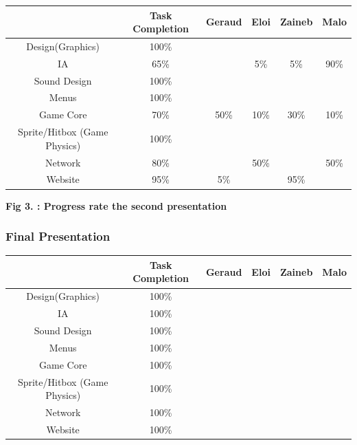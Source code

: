 \documentclass[a4paper, 11pt] {article}
\begin{document}
\begin{center}
\begin{tabular}{|c|c|c|c|c|c|}
    \hline & Task Completion & Geraud & Eloi & Zaineb & Malo  \\
    \hline Design(Graphics) & 100\% &  &  & &  \\
    \hline IA & 65\% &  & 5\% & 5\% & 90\%   \\
    \hline Sound Design & 100\% & & & & \\
    \hline Menus & 100\%  & & & & \\
    \hline Game Core & 70\% & 50\% & 10\% & 30\% & 10\% \\
    \hline Sprite/Hitbox (Game Physics) & 100\% & & & & \\
    \hline Network & 80\% & & 50\% & & 50\% \\
    \hline Website & 95\% & 5\%  &  & 95\% &  \\
    \hline
\end{tabular}
\end{center}

\begin{center}
    \bf{Fig 3. : Progress rate the second presentation}
\end{center}

\newpage

\subsubsection{Final Presentation}

\begin{center}
\begin{tabular}{|c|c|c|c|c|c|}
    \hline & Task Completion & Geraud & Eloi & Zaineb & Malo  \\
    \hline Design(Graphics) & 100\% &  &  & &  \\
    \hline IA & 100\% &  &  &  &   \\
    \hline Sound Design & 100\% & & & & \\
    \hline Menus & 100\%  & & & & \\
    \hline Game Core & 100\%&  &  &  &  \\
    \hline Sprite/Hitbox (Game Physics) & 100\% & & & & \\
    \hline Network &100\% & &  & &  \\
    \hline Website &100\% &  &  &  &  \\
    \hline
\end{tabular}
\end{center}
\end{document}
